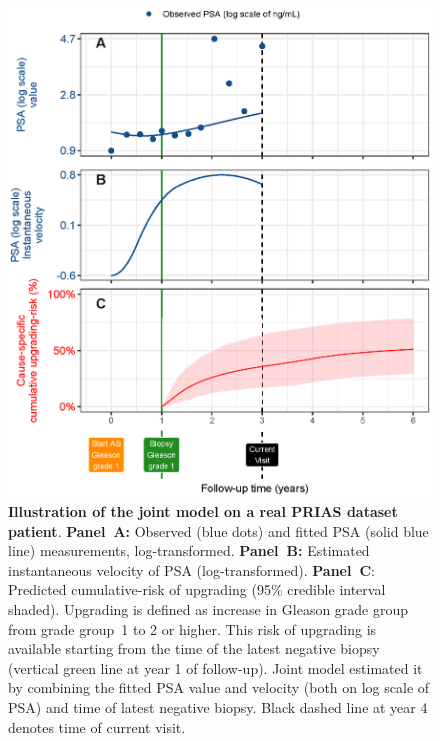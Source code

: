 \begin{figure}
\centerline{\includegraphics[width=\columnwidth]{images/jmExplanationPlot_113.eps}}
\caption{\textbf{Illustration of the joint model on a real PRIAS dataset patient}. \textbf{Panel~A:} Observed (blue dots) and fitted PSA (solid blue line) measurements, log-transformed. \textbf{Panel~B:} Estimated instantaneous velocity of PSA (log-transformed). \textbf{Panel~C}: Predicted cumulative-risk of upgrading (95\% credible interval shaded). Upgrading is defined as increase in Gleason grade group \citep{epsteinGG2014} from grade group~1 to 2 or higher. This risk of upgrading is available starting from the time of the latest negative biopsy (vertical green line at year 1 of follow-up). Joint model estimated it by combining the fitted PSA value and velocity (both on log scale of PSA) and time of latest negative biopsy. Black dashed line at year 4 denotes time of current visit.}
\label{fig:jmExplanationPlot_113}
\end{figure}

